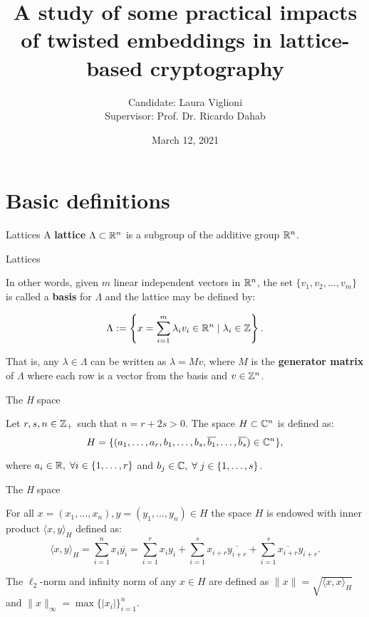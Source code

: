 \documentclass[notheorems, bigger]{beamer}
\author{Candidate: Laura Viglioni \\ Supervisor: Prof. Dr. Ricardo Dahab}
\date{March 12, 2021}
\title{A study of some practical impacts of twisted embeddings in lattice-based cryptography}
\begin{document}
\maketitle

\section{Basic definitions}
\label{sec:org910b0d3}
\begin{frame}[label={sec:orga3d7337}]{Lattices}
A \textbf{lattice} \(\Lambda \subset \mathbb{R}^n\) is a subgroup of the additive group \(\mathbb{R}^n\).
\end{frame}
\begin{frame}[label={sec:org48f51cf}]{Lattices}
\begin{text}
  In other words, given $m$ linear independent vectors in $\mathbb{R}^n$, the set
  $\{v_1, v_2, ..., v_m\}$ is called a \textbf{basis} for $\Lambda$ and the lattice may be defined
  by:

  \begin{equation*}
    \Lambda := \left\{x = \sum_{i=1}^m{\lambda_iv_i} \in \mathbb{R}^n \; | \; \lambda_i \in \mathbb{Z}\right\}.
  \end{equation*}

  That is, any $\lambda \in \Lambda$ can be written as $\lambda = Mv$, where $M$ is the
  \textbf{generator matrix} of $\Lambda$ where each row is a vector from the basis and
  $v \in \mathbb{Z}^n$.
\end{text}
\end{frame}
\begin{frame}[label={sec:org80343f4}]{The \emph{H} space}
\begin{text}
  Let $r,s,n \in \mathbb{Z}_+$ such that $n = r + 2s > 0$. The space $H \subset \mathbb{C}^n$ is defined
  as:
  \begin{equation*}
    H = \{(a_1,\dots, a_r, b_1,\dots, b_s, \overline{b_1}, \dots, \overline{b_s}) \in \mathbb{C}^n\},
  \end{equation*}

  where $a_i \in \mathbb{R}, \; \forall i \in \{1,\dots,r\}$ and $b_j \in \mathbb{C}, \; \forall \; j \in \{1,\dots,
  s\}$.
\end{text}
\end{frame}
\begin{frame}[label={sec:orgd745a28}]{The \emph{H} space}
\begin{text}
  For all $x = \left(x_1, \dots, x_n\right), y = \left(y_1, \dots, y_n\right) \in H$ the space
  $H$ is endowed with inner product $\langle {x,y} \rangle_H$ defined as:
  \begin{equation*}
    \langle {x,y} \rangle_H = \sum_{i=1}^n{x_i \overline{y_i}} = \sum_{i=1}^r{x_i y_i} + \sum_{i=1}^s{x_{i+r} \overline{y_{i+r}}} + \sum_{i=1}^s{\overline{x_{i+r}} y_{i+r}}.
  \end{equation*}

  The $\ell_2$-norm and infinity norm of any $x \in H$ are defined as $\|x\| =
  \sqrt{\langle{x,x}\rangle_H}$ and $\|x\|_\infty = \max{\{ |x_i| \}}_{i=1}^n $.
\end{text}
\end{frame}
\end{document}
